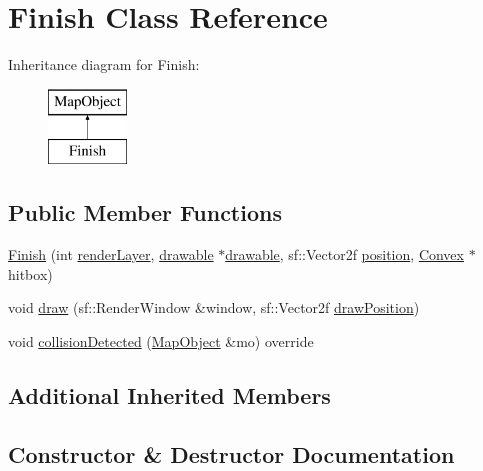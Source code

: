 \hypertarget{class_finish}{}\section{Finish Class Reference}
\label{class_finish}
Inheritance diagram for Finish\+:\begin{figure}[H]
\begin{center}
\leavevmode
\includegraphics[height=2.000000cm]{class_finish}
\end{center}
\end{figure}
\subsection*{Public Member Functions}
\begin{DoxyCompactItemize}
\item 
\hyperlink{class_finish_afa8b074cf402187bf486a564bf01b4af}{Finish} (int \hyperlink{class_map_object_ac7431860a4ca955dc3db173926be3856}{render\+Layer}, \hyperlink{classdrawable}{drawable} $\ast$\hyperlink{classdrawable}{drawable}, sf\+::\+Vector2f \hyperlink{class_map_object_a00491cbf8e4cbc729ef37e11f3473860}{position}, \hyperlink{class_convex}{Convex} $\ast$hitbox)
\item 
void \hyperlink{class_finish_ae65e14b835ffefbb834e23f20cd06e2f}{draw} (sf\+::\+Render\+Window \&window, sf\+::\+Vector2f \hyperlink{class_map_object_a3f383fa967b67989a1d30f8f9ff73936}{draw\+Position})
\item 
void \hyperlink{class_finish_add242b36d73b41b2cd8c2397365a11b0}{collision\+Detected} (\hyperlink{class_map_object}{Map\+Object} \&mo) override
\end{DoxyCompactItemize}
\subsection*{Additional Inherited Members}


\subsection{Constructor \& Destructor Documentation}
\hypertarget{class_finish_afa8b074cf402187bf486a564bf01b4af}{}
